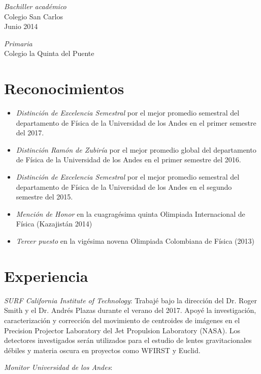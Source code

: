\documentclass[line,margin]{res}
\begin{document}
\begin{resume}
{\sl Bachiller académico} \\
Colegio San Carlos \\
Junio 2014

{\sl Primaria} \\
Colegio la Quinta del Puente

\section{Reconocimientos}

\begin{itemize}

\item {\sl Distinción de Excelencia Semestral} por el mejor promedio semestral del departamento de Física de la Universidad de los Andes en el primer semestre del 2017.

\item {\sl Distinción Ramón de Zubiría} por el mejor promedio global del departamento de Física de la Universidad de los Andes en el primer semestre del 2016.

\item {\sl Distinción de Excelencia Semestral} por el mejor promedio semestral del departamento de Física de la Universidad de los Andes en el segundo semestre del 2015.

\item {\sl Mención de Honor} en la cuagragésima quinta Olimpiada Internacional de Física (Kazajistán 2014)

\item {\sl Tercer puesto} en la vigésima novena Olimpiada Colombiana de Física (2013)

\end{itemize}

\section{Experiencia}

{\sl SURF California Institute of Technology}: Trabajé bajo la dirección del Dr. Roger Smith y el Dr. Andrés Plazas durante el verano del 2017. Apoyé la investigación, caracterización y corrección del movimiento de centroides de imágenes en el Precision Projector Laboratory del Jet Propulsion Laboratory (NASA). Los detectores investigados serán utilizados para el estudio de lentes gravitacionales débiles y materia oscura en proyectos como WFIRST y Euclid.

{\sl Monitor Universidad de los Andes}: 
\begin{itemize}


\end{itemize}
\end{resume}
\end{document}
